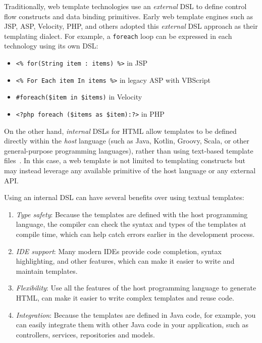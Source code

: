 Traditionally, web template technologies use an \textit{external} DSL to define
control flow constructs and data binding primitives. Early web template engines
such as JSP, ASP, Velocity, PHP, and others adopted this \textit{external} DSL
approach as their templating dialect. For example, a \texttt{foreach} loop can
be expressed in each technology using its own DSL:
\begin{itemize}
  \item \texttt{<\% for(String item : items) \%>} in JSP
  \item \texttt{<\% For Each item In items \%>} in legacy ASP with VBScript
  \item \texttt{\#foreach(\$item in \$items)} in Velocity
  \item \texttt{<?php foreach (\$items as \$item):?>} in PHP
\end{itemize}

On the other hand, \textit{internal} DSLs for HTML allow templates to be
defined directly within the \emph{host} language (such as Java, Kotlin, Groovy,
Scala, or other general-purpose programming languages), rather than using
text-based template files~\cite{carvalho2020}. In this case, a web template
is not limited to templating constructs but may instead leverage any available
primitive of the host language or any external API.

Using an internal DSL can have several benefits over using textual templates:
\begin{enumerate}
  \item \emph{Type safety}: Because the templates are defined with the host
        programming language, the compiler can check the syntax and types of the
        templates at compile time, which can help catch errors earlier in the
        development process.

  \item \emph{IDE support}: Many modern IDEs provide code completion, syntax
        highlighting, and other features, which can make it easier to write and
        maintain templates.

  \item \emph{Flexibility}: Use all the features of the host programming language
        to generate HTML, can make it easier to write complex templates and reuse code.

  \item \emph{Integration}: Because the templates are defined in Java code, for
        example, you can easily integrate them with other Java code in your
        application, such as controllers, services, repositories and models.

\end{enumerate}

